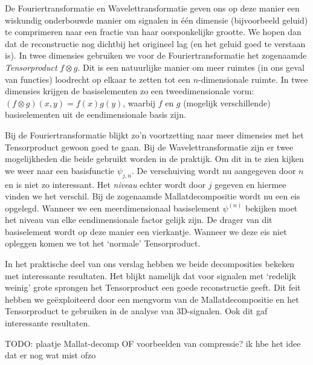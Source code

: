 De Fouriertransformatie en Wavelettransformatie geven ons op deze manier een wiskundig onderbouwde manier om signalen in \'e\'en dimensie (bijvoorbeeld geluid) te comprimeren naar een fractie van haar oorsponkelijke grootte. We hopen dan dat de reconstructie nog dichtbij het origineel lag (en het geluid goed te verstaan is). In twee dimensies gebruiken we voor de Fouriertransformatie het zogenaamde \emph{Tensorproduct} $f \otimes g$. Dit is een natuurlijke manier om meer ruimtes (in ons geval van functies) loodrecht op elkaar te zetten tot een $n$-dimensionale ruimte. In twee dimensies krijgen de basiselementen zo een tweedimensionale vorm: $(f \otimes g)(x,y) = f(x)g(y)$, waarbij $f$ en $g$ (mogelijk verschillende) basiselementen uit de eendimensionale basis zijn.

Bij de Fouriertransformatie blijkt zo'n voortzetting naar meer dimensies met het Tensorproduct gewoon goed te gaan. Bij de Wavelettransformatie zijn er twee mogelijkheden die beide gebruikt worden in de praktijk. Om dit in te zien kijken we weer naar een basisfunctie $\psi_{j,n}$. De verschuiving wordt nu aangegeven door $n$ en is niet zo interessant. Het \emph{niveau} echter wordt door $j$ gegeven en hiermee vinden we het verschil. Bij de zogenaamde Mallatdecompositie wordt nu een eis opgelegd. Wanneer we een meerdimensionaal basiselement $\psi^{(n)}$ bekijken moet het niveau van elke eendimensionale factor gelijk zijn. De drager van dit basiselement wordt op deze manier een vierkantje. Wanneer we deze eis niet opleggen komen we tot het `normale' Tensorproduct.

In het praktische deel van ons verslag hebben we beide decomposities bekeken met interessante resultaten. Het blijkt namelijk dat voor signalen met `redelijk weinig' grote sprongen het Tensorproduct een goede reconstructie geeft. Dit feit hebben we ge\"exploiteerd door een mengvorm van de Mallatdecompositie en het Tensorproduct te gebruiken in de analyse van 3D-signalen. Ook dit gaf interessante resultaten.

TODO: plaatje Mallat-decomp OF voorbeelden van compressie? ik hbe het idee dat er nog wat mist ofzo
